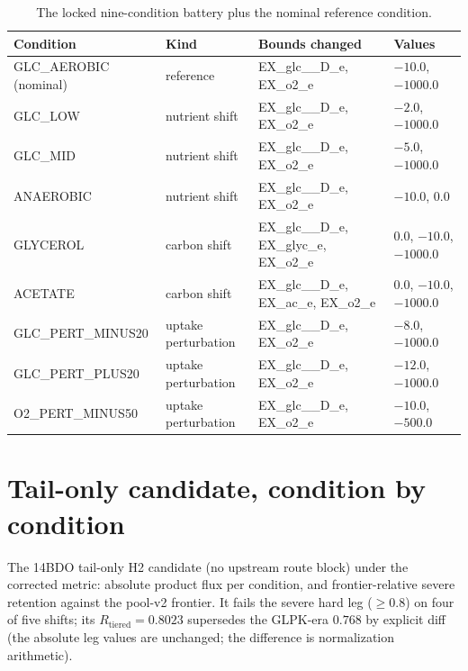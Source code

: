 \documentclass[12pt,a4paper]{article}
\begin{document}
\begin{table}[h]
\centering
\small
\caption{The locked nine-condition battery plus the nominal reference condition.}
\label{tab:battery}
\footnotesize
\begin{tabular}{l l p{4.2cm} l}
\hline
Condition & Kind & Bounds changed & Values \\
\hline
GLC\_AEROBIC (nominal) & reference & EX\_glc\_\_D\_e, EX\_o2\_e & $-10.0$, $-1000.0$ \\
GLC\_LOW & nutrient shift & EX\_glc\_\_D\_e, EX\_o2\_e & $-2.0$, $-1000.0$ \\
GLC\_MID & nutrient shift & EX\_glc\_\_D\_e, EX\_o2\_e & $-5.0$, $-1000.0$ \\
ANAEROBIC & nutrient shift & EX\_glc\_\_D\_e, EX\_o2\_e & $-10.0$, $0.0$ \\
GLYCEROL & carbon shift & EX\_glc\_\_D\_e, EX\_glyc\_e, EX\_o2\_e & $0.0$, $-10.0$, $-1000.0$ \\
ACETATE & carbon shift & EX\_glc\_\_D\_e, EX\_ac\_e, EX\_o2\_e & $0.0$, $-10.0$, $-1000.0$ \\
GLC\_PERT\_MINUS20 & uptake perturbation & EX\_glc\_\_D\_e, EX\_o2\_e & $-8.0$, $-1000.0$ \\
GLC\_PERT\_PLUS20 & uptake perturbation & EX\_glc\_\_D\_e, EX\_o2\_e & $-12.0$, $-1000.0$ \\
O2\_PERT\_MINUS50 & uptake perturbation & EX\_glc\_\_D\_e, EX\_o2\_e & $-10.0$, $-500.0$ \\
\hline
\end{tabular}
\end{table}

\section{Tail-only candidate, condition by condition}
The 14BDO tail-only H2 candidate (no upstream route block) under the corrected metric: absolute product flux per condition, and frontier-relative severe retention against the pool-v2 frontier. It fails the severe hard leg ($\ge 0.8$) on four of five shifts; its $R_{\mathrm{tiered}} = 0.8023$ supersedes the GLPK-era $0.768$ by explicit diff (the absolute leg values are unchanged; the difference is normalization arithmetic).
\end{document}
